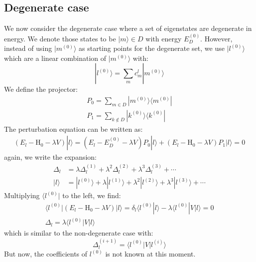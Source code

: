\documentclass{article}
\newcommand{\huptb}{\text{H}_0}
\newcommand{\order}[2]{#1^{(#2)}}
\newcommand{\statebra}[1]{\langle #1 |}
\newcommand{\stateket}[1]{| #1 \rangle}
\begin{document}
\subsection{Degenerate case}
We now consider the degenerate case where a set of eigenstates are degenerate in 
energy. We denote those states to be $\stateket{m}\in D$ with energy $\order{E_D}{0}$. 
However, instead of using $\stateket{\order{m}{0}}$ as starting points for the
degenerate set, we use $\stateket{\order{l}{0}}$ which are a linear combination of $\stateket{\order{m}{0}}$
with:
\begin{equation}
    \stateket{\order{l}{0}} = \sum_m c_m^l \stateket{\order{m}{0}}
\end{equation} 
We define the projector:
\begin{align}
    P_0 = \sum_{m\in D} \stateket{\order{m}{0}} \statebra{ \order{m}{0} } \\
    P_1 = \sum_{k\notin D} \stateket{\order{k}{0}} \statebra{ \order{k}{0} }
\end{align}
The perturbation equation can be written as:
\begin{align}
    (E_l - \huptb - \lambda V) \stateket{l} = 
    (E_l - \order{E_D}{0} - \lambda V) P_0 \stateket{l} + (E_l - \huptb - \lambda V) P_1 \stateket{l} = 0
\end{align}
again, we write the expansion:
\begin{align}    
    \Delta_l &= \lambda \order{\Delta_l}{1} + \lambda^2 \order{\Delta_l}{2} + \lambda^3 \order{\Delta_l}{3} + \cdots \\
    \stateket{l} &= \stateket{\order{l}{0}} + \lambda \stateket{\order{l}{1}} + 
                    \lambda^2 \stateket{\order{l}{2}} + \lambda^3 \stateket{\order{l}{3}} + \cdots
\end{align}
Multiplying $\statebra{\order{l}{0}}$ to the left, we find:
\begin{gather}
    \statebra{\order{l}{0}} (E_l - \huptb - \lambda V) \stateket{l} 
    = \delta_l \statebra{\order{l}{0}} l \rangle - \lambda \statebra{\order{l}{0}} V \stateket{l} = 0 \\ 
    \Delta_l = \lambda \statebra{\order{l}{0}} V \stateket{l}
\end{gather}
which is similar to the non-degenerate case with:
\begin{equation}
    \label{E:Delta_l}
    \order{\Delta_l}{i+1} = \statebra{\order{l}{0}} V \stateket{\order{l}{i}} 
\end{equation}
But now, the coefficients of $\order{l}{0}$ is not known at this moment.
\end{document}
